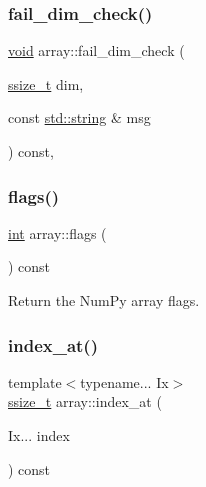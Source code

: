 \mbox{\label{classarray_a00dcb86f0bf1f925b23bd9ab028ffa13}} 
\subsubsection{\texorpdfstring{fail\_dim\_check()}{fail\_dim\_check()}}
{\footnotesize\ttfamily \mbox{\hyperlink{_s_d_l__opengles2__gl2ext_8h_ae5d8fa23ad07c48bb609509eae494c95}{void}} array\+::fail\+\_\+dim\+\_\+check (\begin{DoxyParamCaption}\item[{\mbox{\hyperlink{detail_2common_8h_ac430d16fc097b3bf0a7469cfd09decda}{ssize\+\_\+t}}}]{dim,  }\item[{const \mbox{\hyperlink{_s_d_l__opengl__glext_8h_ab4ccfaa8ab0e1afaae94dc96ef52dde1}{std\+::string}} \&}]{msg }\end{DoxyParamCaption}) const\hspace{0.3cm}{\ttfamily [inline]}, {\ttfamily [protected]}}

\mbox{\label{classarray_a38eb48c793621c12119ab7b64714955b}} 
\subsubsection{\texorpdfstring{flags()}{flags()}}
{\footnotesize\ttfamily \mbox{\hyperlink{warnings_8h_a74f207b5aa4ba51c3a2ad59b219a423b}{int}} array\+::flags (\begin{DoxyParamCaption}{ }\end{DoxyParamCaption}) const\hspace{0.3cm}{\ttfamily [inline]}}



Return the Num\+Py array flags. 

\mbox{\label{classarray_a48d7b1bd08e0a5cf1ef27a6996421e73}} 
\subsubsection{\texorpdfstring{index\_at()}{index\_at()}}
{\footnotesize\ttfamily template$<$typename... Ix$>$ \\
\mbox{\hyperlink{detail_2common_8h_ac430d16fc097b3bf0a7469cfd09decda}{ssize\+\_\+t}} array\+::index\+\_\+at (\begin{DoxyParamCaption}\item[{Ix...}]{index }\end{DoxyParamCaption}) const\hspace{0.3cm}{\ttfamily [inline]}}

